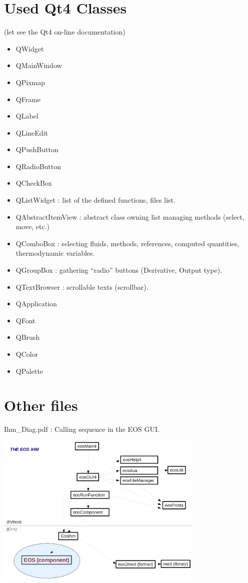 \documentclass[10pt,a4paper]{article}
\begin{document}
\section{Used Qt4 Classes}

(let see the Qt4 on-line documentation)

\begin{itemize}
\item QWidget
\item QMainWindow
\item QPixmap
\item QFrame
\item QLabel
\item QLineEdit
\item QPushButton
\item QRadioButton
\item QCheckBox
\item QListWidget : list of the defined functions, files list.
\item QAbstractItemView : abstract class owning list managing methods (select, move, etc.)
\item QComboBox : selecting fluids, methods, references, computed quantities, thermodynamic variables.
\item QGroupBox : gathering ``radio'' buttons (Derivative, Output type).
\item QTextBrowser : scrollable texts (scrollbar).
\item QApplication
\item QFont
\item QBrush
\item QColor
\item QPalette
\end{itemize}





\appendix

\section{Other files}

Ihm\_Diag.pdf :  Calling sequence in the EOS GUI.

%
\begin{center}\includegraphics[width=10cm,angle=0]{IhmDiag.eps}\end{center}
\end{document}
